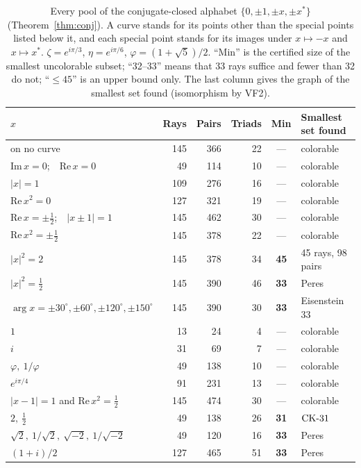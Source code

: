 \begin{table}[t]
\centering
\caption{Every pool of the conjugate-closed alphabet $\{0,\pm1,\pm x,\pm x^{*}\}$
(Theorem~\ref{thm:conj}).  A curve stands for its points other than the special points listed
below it, and each special point stands for its images under $x\mapsto-x$ and
$x\mapsto x^{*}$.  $\zeta=e^{i\pi/3}$, $\eta=e^{i\pi/6}$, $\varphi=(1+\sqrt5)/2$.  ``Min'' is
the certified size of the smallest uncolorable subset; ``32--33'' means that 33 rays suffice
and fewer than 32 do not; ``$\le45$'' is an upper bound only.  The last column gives the graph
of the smallest set found (isomorphism by VF2).}
\label{tab:conj}
\small
\begin{tabular}{@{}lrrrcl@{}}
\toprule
$x$ & Rays & Pairs & Triads & Min & Smallest set found \\
\midrule
on no curve & 145 & 366 & 22 & --- & colorable \\
$\mathrm{Im}\,x=0$;\ \ $\mathrm{Re}\,x=0$ & 49 & 114 & 10 & --- & colorable \\
$|x|=1$ & 109 & 276 & 16 & --- & colorable \\
$\mathrm{Re}\,x^2=0$ & 127 & 321 & 19 & --- & colorable \\
$\mathrm{Re}\,x=\pm\tfrac12$;\ \ $|x\pm1|=1$ & 145 & 462 & 30 & --- & colorable \\
$\mathrm{Re}\,x^2=\pm\tfrac12$ & 145 & 378 & 22 & --- & colorable \\
$|x|^2=2$ & 145 & 378 & 34 & \textbf{45} & 45 rays, 98 pairs \\
$|x|^2=\tfrac12$ & 145 & 390 & 46 & \textbf{33} & Peres \\
$\arg x=\pm30^\circ,\pm60^\circ,\pm120^\circ,\pm150^\circ$ & 145 & 390 & 30 & \textbf{33} & Eisenstein 33 \\
\midrule
$1$ & 13 & 24 & 4 & --- & colorable \\
$i$ & 31 & 69 & 7 & --- & colorable \\
$\varphi,\ 1/\varphi$ & 49 & 138 & 10 & --- & colorable \\
$e^{i\pi/4}$ & 91 & 231 & 13 & --- & colorable \\
$|x-1|=1$ and $\mathrm{Re}\,x^2=\tfrac12$ & 145 & 474 & 30 & --- & colorable \\
\midrule
$2,\ \tfrac12$ & 49 & 138 & 26 & \textbf{31} & $\mathrm{CK}\text{-}31$ \\
$\sqrt2,\ 1/\sqrt2,\ \sqrt{-2},\ 1/\sqrt{-2}$ & 49 & 120 & 16 & \textbf{33} & Peres \\
$(1+i)/2$ & 127 & 465 & 51 & \textbf{33} & Peres \\

\end{tabular}
\end{table}
